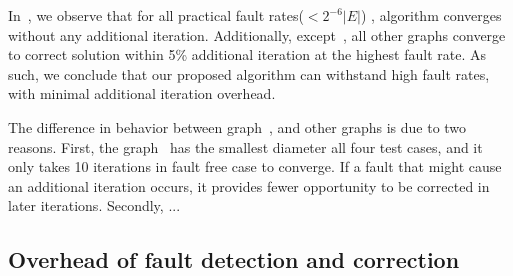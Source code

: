 In~, we observe that for all practical fault rates($<2^{-6}|E|$) , algorithm converges without any additional iteration.
Additionally, except~, all other graphs converge to correct solution within 5\% additional iteration at the highest fault rate. As such, we conclude that our proposed algorithm can withstand high fault rates, with minimal additional iteration overhead.   

The difference in behavior between graph~, and other graphs is due to two reasons. First, the graph~ has  the smallest diameter all four test cases, and it only takes 10 iterations in fault free case to converge. If a fault that might cause an additional iteration occurs, it provides fewer opportunity to be corrected in later iterations. Secondly, ...

\subsection{Overhead of fault detection and correction}

